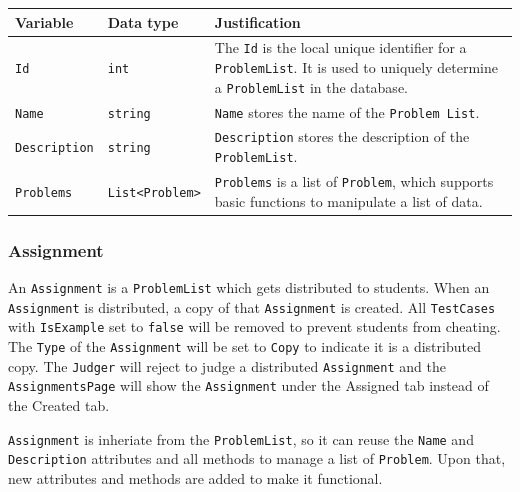 \documentclass[a4paper]{report}
\newcommand{\code}{\texttt}
\begin{document}
\begin{tabulary}{\textwidth}{|l|l|L|}
    \hline
    Variable & Data type & Justification \\
    \hline
    \code{Id} & \code{int} & The \code{Id} is the local unique identifier for a \code{ProblemList}. It is used to uniquely determine a \code{ProblemList} in the database. \\
    \hline
    \code{Name} & \code{string} & \code{Name} stores the name of the \code{Problem List}. \\
    \hline
    \code{Description} & \code{string} & \code{Description} stores the description of the \code{ProblemList}. \\
    \hline
    \code{Problems} & \code{List<Problem>} & \code{Problems} is a list of \code{Problem}, which supports basic functions to manipulate a list of data. \\
    \hline
\end{tabulary}

\subsubsection{Assignment}

An \code{Assignment} is a \code{ProblemList} which gets distributed to students. When an \code{Assignment} is distributed, a copy of that \code{Assignment} is created. All \code{TestCases} with \code{IsExample} set to \code{false} will be removed to prevent students from cheating. The \code{Type} of the \code{Assignment} will be set to \code{Copy} to indicate it is a distributed copy. The \code{Judger} will reject to judge a distributed \code{Assignment} and the \code{AssignmentsPage} will show the \code{Assignment} under the Assigned tab instead of the Created tab.

\code{Assignment} is inheriate from the \code{ProblemList}, so it can reuse the \code{Name} and \code{Description} attributes and all methods to manage a list of \code{Problem}. Upon that, new attributes and methods are added to make it functional.
\end{document}
